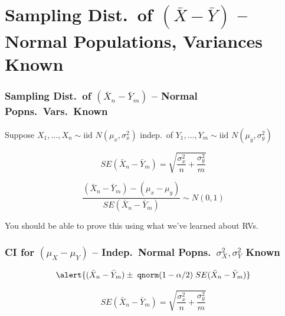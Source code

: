 \section{Sampling Dist.\ of $(\bar{X} - \bar{Y})$ -- Normal Populations, Variances Known}
\begin{frame}
\frametitle{Sampling Dist.\ of $(\bar{X}_n - \bar{Y}_m)$ -- Normal Popns.\ Vars.\ Known}

\small

Suppose $X_1, \hdots, X_{n} \sim \mbox{iid } N(\mu_x, \sigma^2_x)$ indep.\ of $Y_1, \hdots, Y_{m} \sim \mbox{iid } N(\mu_y, \sigma^2_y)$

\[SE(\bar{X}_n - \bar{Y}_m) = \sqrt{\displaystyle\frac{\sigma_x^2}{n} + \frac{\sigma_y^2}{m}}\]

\[\frac{\left(\bar{X}_n - \bar{Y}_m\right) - (\mu_x - \mu_y)}{SE(\bar{X}_n - \bar{Y}_m) } \sim N(0,1)\]

\vspace{1em}

\alert{You should be able to prove this using what we've learned about RVs.}



\end{frame}
\begin{frame}
  \frametitle{CI for $(\mu_X - \mu_Y)$ -- Indep.\ Normal Popns.\, $\sigma_X^2, \sigma_Y^2$ Known}

	$$\alert{(\bar{X}_n - \bar{Y}_m) \pm \; \texttt{qnorm}(1-\alpha/2) \; SE(\bar{X}_n - \bar{Y}_m)}$$

  $$SE(\bar{X}_n - \bar{Y}_m) = \sqrt{\displaystyle\frac{\sigma_x^2}{n} + \frac{\sigma_y^2}{m} }$$
\end{frame}
%
%
%
%
%
